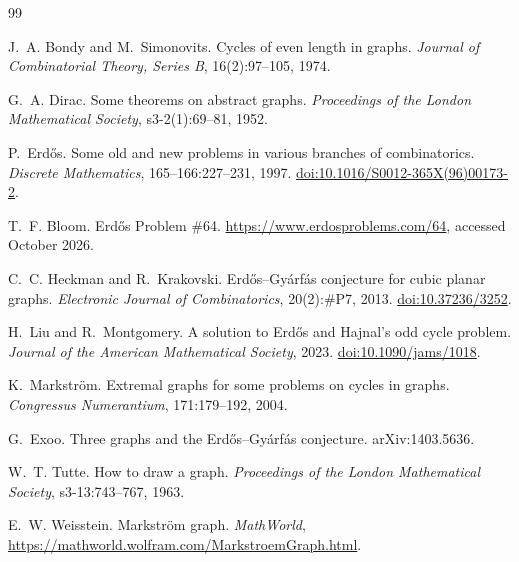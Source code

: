 \documentclass[11pt,a4paper]{article}
\theoremstyle{definition}
\newcommand{\doi}[1]{\href{https://doi.org/#1}{doi:#1}}
\begin{document}
\begin{thebibliography}{99}

J.~A. Bondy and M.~Simonovits.
\newblock Cycles of even length in graphs.
\newblock \emph{Journal of Combinatorial Theory, Series B}, 16(2):97--105, 1974.

G.~A. Dirac.
\newblock Some theorems on abstract graphs.
\newblock \emph{Proceedings of the London Mathematical Society}, s3-2(1):69--81,
  1952.

P.~Erd\H{o}s.
\newblock Some old and new problems in various branches of combinatorics.
\newblock \emph{Discrete Mathematics}, 165--166:227--231, 1997.
\newblock \doi{10.1016/S0012-365X(96)00173-2}.

T.~F. Bloom.
\newblock Erd\H{o}s Problem \#64.
\newblock \url{https://www.erdosproblems.com/64}, accessed October 2026.

C.~C. Heckman and R.~Krakovski.
\newblock Erd\H{o}s--Gy\'arf\'as conjecture for cubic planar graphs.
\newblock \emph{Electronic Journal of Combinatorics}, 20(2):\#P7, 2013.
\newblock \doi{10.37236/3252}.

H.~Liu and R.~Montgomery.
\newblock A solution to Erd\H{o}s and Hajnal's odd cycle problem.
\newblock \emph{Journal of the American Mathematical Society}, 2023.
\newblock \doi{10.1090/jams/1018}.

K.~Markstr\"om.
\newblock Extremal graphs for some problems on cycles in graphs.
\newblock \emph{Congressus Numerantium}, 171:179--192, 2004.

G.~Exoo.
\newblock Three graphs and the Erd\H{o}s--Gy\'arf\'as conjecture.
\newblock arXiv:1403.5636.

W.~T. Tutte.
\newblock How to draw a graph.
\newblock \emph{Proceedings of the London Mathematical Society}, s3-13:743--767,
  1963.

E.~W. Weisstein.
\newblock Markstr\"om graph.
\newblock \emph{MathWorld}, \url{https://mathworld.wolfram.com/MarkstroemGraph.html}.

\end{thebibliography}
\end{document}
